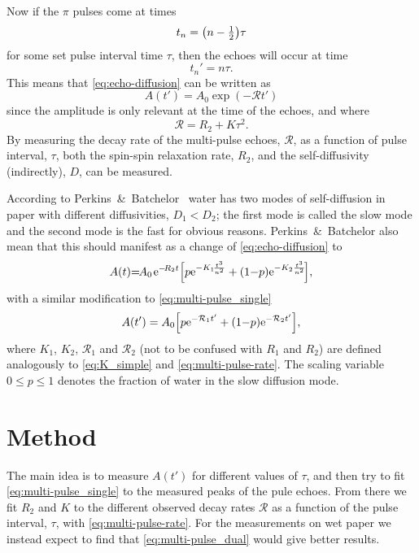 \documentclass[11pt,a4paper, twocolumn,
swedish, english %
]{article}
\begin{document}
Now if the $\pi$ pulses come at times
\begin{equation}\label{eq:pulse-times}
t_{n}=\qty(n-\tfrac{1}{2})\tau
\end{equation}
for some set pulse interval time $\tau$, then the echoes will occur at
time  
\begin{equation}
t_n'=n\tau.
\end{equation}
This means that \eqref{eq:echo-diffusion} can be written as
\begin{equation}\label{eq:multi-pulse_single}
A(t')=A_0\exp(-\mathcal{R}t')
\end{equation}
since the amplitude is only relevant at the time of the echoes, and
where 
\begin{equation}\label{eq:multi-pulse-rate}
\mathcal{R}=R_2+K\tau^2.
\end{equation}
By measuring the decay rate of the multi-pulse echoes, $\mathcal{R}$,
as a function of pulse interval, $\tau$, both the spin-spin relaxation
rate, $R_2$, and the self-diffusivity (indirectly), $D$, can be measured.

According to Perkins~\&~Batchelor~\cite{Perkins-Batchelor2012} water
has two modes of self-diffusion in paper with different diffusivities,
$D_1<D_2$; the first mode is called the slow mode and the second mode
is the fast for obvious reasons. Perkins~\&~Batchelor also mean that
this should manifest as a change of 
\eqref{eq:echo-diffusion} to
\begin{equation}
\begin{aligned}
A(t){=}\hspace{-1pt}A_0\hspace{1pt}
\mathrm{e}^{{-}\!R_2t}\qty[
p\mathrm{e}^{{-}K_1\!\frac{t^3}{n^2}} + (1{-}p)\mathrm{e}^{{-}K_2\frac{t^3}{n^2}}
\!],
\end{aligned}
\end{equation}
with a similar modification to \eqref{eq:multi-pulse_single}
\begin{equation}\label{eq:multi-pulse_dual}
A(t')=A_0\qty[p\mathrm{e}^{-\mathcal{R}_1t'}+
(1{-}p)\mathrm{e}^{-\mathcal{R}_2t'}],
\end{equation}
where $K_1$, $K_2$, $\mathcal{R}_1$ and $\mathcal{R}_2$ (not to be
confused with $R_1$ and $R_2$) are defined analogously to
\eqref{eq:K_simple} and \eqref{eq:multi-pulse-rate}. The
scaling variable $0\le p\le1$ denotes the fraction of water in the
slow diffusion mode. 



\section{Method} \label{sec:met}
The main idea is to measure $A(t')$ for different values of $\tau$,
and then try to fit \eqref{eq:multi-pulse_single} to the measured
peaks of the pule echoes. From there we fit $R_2$ and $K$ to the
different observed decay rates $\mathcal{R}$ as a function of the
pulse interval, $\tau$, with \eqref{eq:multi-pulse-rate}. For the
measurements on wet paper we instead expect to find that
\eqref{eq:multi-pulse_dual} would give better results.
\end{document}
